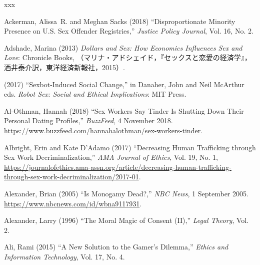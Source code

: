 \documentclass[]{jlreq} \usepackage{mystyle}
\begin{document}
\makeatletter{}\relax\makeatother
\begin{thebibliography}{xxx}


Ackerman, Alissa~R. and Meghan Sacks (2018) ``Disproportionate Minority
  Presence on U.S. Sex Offender Registries,'' \textit{ Justice Policy Journal},
  Vol. 16, No. 2.

Adshade, Marina (2013)  \textit{ Dollars and Sex: How Economics Influences Sex
  and Love}: Chronicle Books,
  （マリナ・アドシェイド，『セックスと恋愛の経済学』，酒井泰介訳，東洋経済新報社，2015）.

 \bysame{}  (2017) ``Sexbot-Induced Social Change,'' in Danaher, John and Neil
  McArthur eds.   \textit{ Robot Sex: Social and Ethical Implications}: MIT
  Press.

Al-Othman, Hannah (2018) ``Sex Workers Say Tinder Is Shutting Down Their
  Personal Dating Profiles,'' \emph{BuzzFeed}, 4 November 2018.
  \url{https://www.buzzfeed.com/hannahalothman/sex-workers-tinder}.

Albright, Erin and Kate D'Adamo (2017) ``Decreasing Human Trafficking through
  Sex Work Decriminalization,'' \textit{ AMA Journal of Ethics}, Vol. 19, No.
  1,
  \url{https://journalofethics.ama-assn.org/article/decreasing-human-trafficking-through-sex-work-decriminalization/2017-01}.

Alexander, Brian (2005) ``Is Monogamy Dead?,'' \emph{NBC News}, 1 September
  2005. \url{https://www.nbcnews.com/id/wbna9117931}.

Alexander, Larry (1996) ``The Moral Magic of Consent (II),'' \textit{ Legal
  Theory}, Vol. 2.

Ali, Rami (2015) ``A New Solution to the Gamer's Dilemma,'' \textit{ Ethics and
  Information Technology}, Vol. 17, No. 4.


\end{thebibliography}
\end{document}
